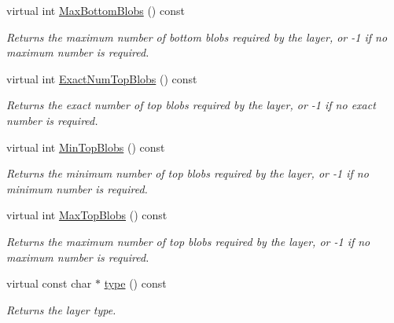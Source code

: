 \begin{DoxyCompactItemize}
virtual int \hyperlink{classcaffe_1_1InfogainLossLayer_ae6cf4ae009630b28583b161c33b582cb}{Max\+Bottom\+Blobs} () const 
\begin{DoxyCompactList}\small\item\em Returns the maximum number of bottom blobs required by the layer, or -\/1 if no maximum number is required. \end{DoxyCompactList}\item 
virtual int \hyperlink{classcaffe_1_1InfogainLossLayer_aa25f7b12805d10dccc217669f589fc95}{Exact\+Num\+Top\+Blobs} () const 
\begin{DoxyCompactList}\small\item\em Returns the exact number of top blobs required by the layer, or -\/1 if no exact number is required. \end{DoxyCompactList}\item 
virtual int \hyperlink{classcaffe_1_1InfogainLossLayer_ab7281f377aae57aa744a6b83bed02111}{Min\+Top\+Blobs} () const 
\begin{DoxyCompactList}\small\item\em Returns the minimum number of top blobs required by the layer, or -\/1 if no minimum number is required. \end{DoxyCompactList}\item 
virtual int \hyperlink{classcaffe_1_1InfogainLossLayer_ab77d568acf51c32b8a28bfc45504d382}{Max\+Top\+Blobs} () const 
\begin{DoxyCompactList}\small\item\em Returns the maximum number of top blobs required by the layer, or -\/1 if no maximum number is required. \end{DoxyCompactList}\item 
virtual const char $\ast$ \hyperlink{classcaffe_1_1InfogainLossLayer_ab8056925c12f917270f60d843f840d63}{type} () const \hypertarget{classcaffe_1_1InfogainLossLayer_ab8056925c12f917270f60d843f840d63}{}\label{classcaffe_1_1InfogainLossLayer_ab8056925c12f917270f60d843f840d63}

\begin{DoxyCompactList}\small\item\em Returns the layer type. \end{DoxyCompactList}\end{DoxyCompactItemize}
